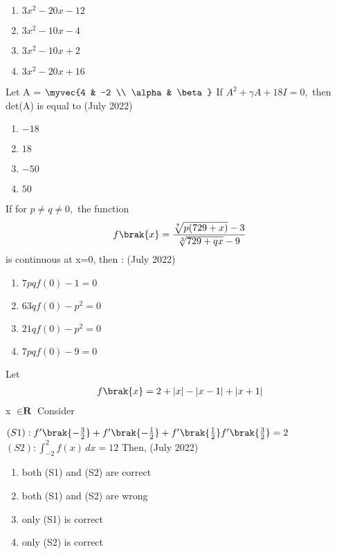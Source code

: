     \begin{enumerate}
        \item $3x^2 - 20x -12$
        \item $3x^2 -10x-4$ 
        \item $3x^2 - 10x +2$ 
        \item $3x^2 -20x + 16$   
    \end{enumerate}


     \item Let A = $\myvec{4 & -2 \\ \alpha & \beta}$ If $A^2 + \gamma A + 18I = 0,$ then det(A) is equal to 
     \hfill(July 2022)
     
     \begin{enumerate}
         \item $-18$ 
         \item $18$ 
         \item $-50$ 
         \item $50$     
     \end{enumerate}


     \item If for $p \neq q \neq 0,$ the function 
     \begin{align*}
         f\brak{x} =\frac{\sqrt[7]{p(729 + x)}-3}{\sqrt[3]{729 +qx} -9}  
     \end{align*} 
     is continuous at x=0, then :
     \hfill(July 2022)
     \begin{enumerate}
         \item $7pqf(0)- 1 =0$
         \item $63qf(0)- p^2 =0$
         \item $21qf(0) - p^2 =0$
         \item $7pqf(0)-9 = 0$
     \end{enumerate}


     \item Let
     \begin{align*}
        f\brak{x} =2 + |x| - |x-1| + |x+1| 
     \end{align*} 
     x $\in \textbf{R} $ Consider
     
         $(S1): f^\prime\brak{-{\frac{3}{2}}} + f^\prime\brak{-{\frac{1}{2}}} + f^\prime\brak{{\frac{1}{2}}} f^\prime\brak{{\frac{3}{2}}} = 2$\\
     $(S2) : \int_{-2}^2 f(x) \, dx = 12$ Then,
     \hfill(July 2022)
     \begin{enumerate}
         \item both (S1) and (S2) are correct 
         \item both (S1) and (S2) are wrong 
         \item only (S1) is correct 
        \item only (S2) is correct 
     \end{enumerate}


